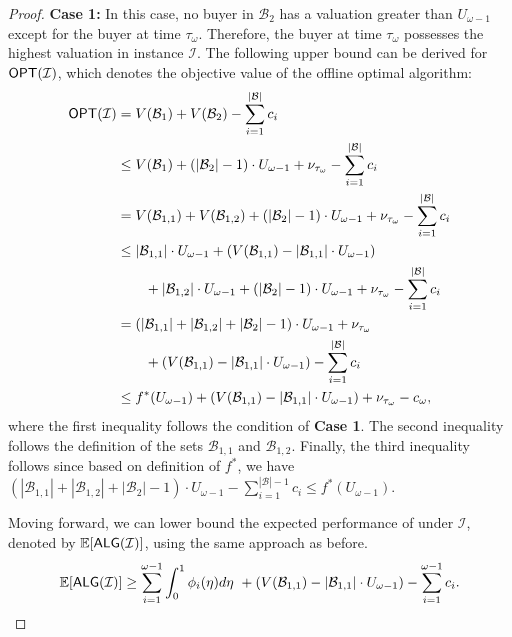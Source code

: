 \begin{proof}
\textbf{Case 1:}
In this case,  no buyer in $\mathcal{B}_{2}$ has a valuation greater than $U_{\omega-1}$ except for the buyer at time $\tau_{\omega}$. Therefore, the buyer at time $\tau_{\omega}$ possesses the highest valuation in instance $\mathcal{I}$. The following upper bound can be derived for $\textsf{OPT}(\mathcal{I})$, which denotes the objective value of the offline optimal algorithm:
\vspace{-0.2cm}
\begin{align*}
    \textsf{OPT}(\mathcal{I}) &= V(\mathcal{B}_{1} ) + V(\mathcal{B}_{2} ) - \sum_{i=1}^{|\mathcal{B}|} c_{i}\\
    & \leq V(\mathcal{B}_{1} ) + (|\mathcal{B}_{2}|-1) \cdot U_{\omega-1} + \nu_{\tau_{\omega}} - \sum_{i=1}^{|\mathcal{B}|} c_{i} \\
    &=  V(\mathcal{B}_{1,1}) + V(\mathcal{B}_{1,2}) + (|\mathcal{B}_{2}|-1)  \cdot U_{\omega-1} + \nu_{\tau_{\omega}} - \sum_{i=1}^{|\mathcal{B}|} c_{i} \\
    & \leq  |\mathcal{B}_{1,1}| \cdot U_{\omega-1} + (V(\mathcal{B}_{1,1}) - |\mathcal{B}_{1,1}| \cdot U_{\omega-1} )  \\
    & \qquad + |\mathcal{B}_{1,2}| \cdot U_{\omega-1} + (|\mathcal{B}_{2}|-1)  \cdot U_{\omega-1} + \nu_{\tau_{\omega}} - \sum_{i=1}^{|\mathcal{B}|} c_{i} \\
    & = (|\mathcal{B}_{1,1}| + |\mathcal{B}_{1,2}| + |\mathcal{B}_{2}|-1) \cdot U_{\omega-1}  + \nu_{\tau_{\omega}}  \\
    & \qquad + (V(\mathcal{B}_{1,1}) - |\mathcal{B}_{1,1}| \cdot U_{\omega-1} ) - \sum_{i=1}^{|\mathcal{B}|} c_{i} \\
    & \leq f^{*}(U_{\omega-1}) + (V(\mathcal{B}_{1,1}) - |\mathcal{B}_{1,1}| \cdot U_{\omega-1} ) + \nu_{\tau_{\omega}} - c_{\omega},
\end{align*}
where the first inequality follows the condition of \textbf{Case 1}. The second inequality follows the definition of the sets $\mathcal{B}_{1,1}$ and $\mathcal{B}_{1,2}$.
Finally, the third inequality follows since based on definition of $f^{*}$, we have $(|\mathcal{B}_{1,1}| + |\mathcal{B}_{1,2}| + |\mathcal{B}_{2}|-1) \cdot U_{\omega-1}  - \sum_{i=1}^{|\mathcal{B}|-1} c_{i} \leq  f^{*}(U_{\omega-1})$.

Moving forward, we can lower bound the expected performance of \rDynamic under $\mathcal{I}$, denoted by $\mathbb{E} [\textsf{ALG}(\mathcal{I})]$, using the same approach as before. 
\begin{align*}
    \mathbb{E}  [\textsf{ALG}(\mathcal{I})]
    \ge  \sum_{i=1}^{\omega-1} \int_{0}^{1} \phi_i(\eta) d\eta \ + (V(\mathcal{B}_{1,1}) - |\mathcal{B}_{1,1}| \cdot U_{\omega-1}) - \sum_{i=1}^{\omega-1} c_{i}.
\end{align*}


\end{proof}
